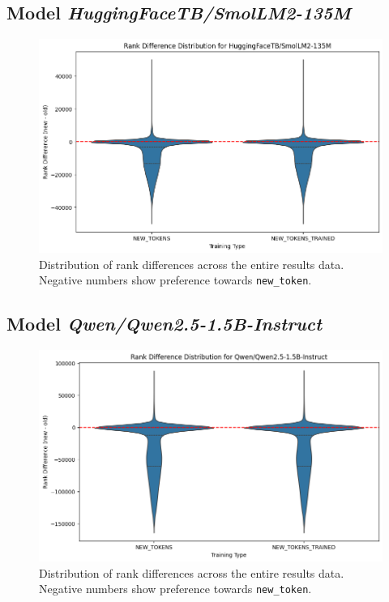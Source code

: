 \subsection{Model \textit{HuggingFaceTB/SmolLM2-135M}}
\begin{figure}[H]
    \centering
    \includegraphics[width=1\textwidth]{Figures//Appendix/violin_smol135M.png}
    \caption[\text{ }\text{ }Distribution of Rank Differences for model \textit{SmolLM2-135M}]{Distribution of rank differences across the entire results data. Negative numbers show preference towards \texttt{new\_token}.}
    \label{annex:fig:violin_rank_dist:smol135M}
\end{figure}


\subsection{Model \textit{Qwen/Qwen2.5-1.5B-Instruct}}
\begin{figure}[H]
    \centering
    \includegraphics[width=1\textwidth]{Figures//Appendix/violin_qwen.png}
    \caption[\text{ }\text{ }Distribution of Rank Differences for model \textit{Qwen2.5-1.5B-Instruct}]{Distribution of rank differences across the entire results data. Negative numbers show preference towards \texttt{new\_token}.}
    \label{annex:fig:violin_rank_dist:qwen1.5B}
\end{figure}


